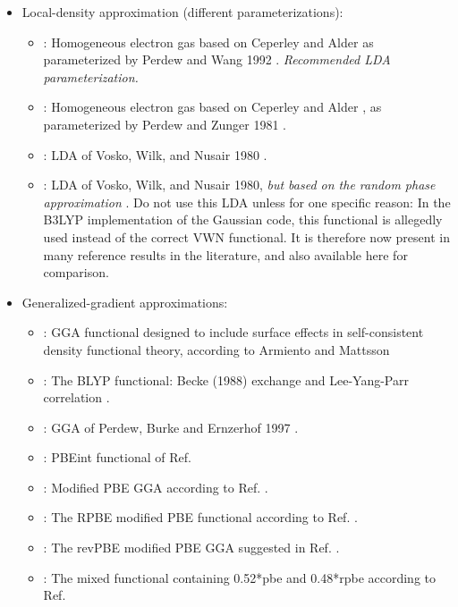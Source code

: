 \begin{itemize}
  \item Local-density approximation (different parameterizations):
    \begin{itemize}
      \item {} : Homogeneous electron gas based on Ceperley and
        Alder \cite{Cep80} as parameterized by Perdew and Wang 1992
        \cite{Per92}. \emph{Recommended LDA parameterization.}
      \item {} : Homogeneous electron gas based on Ceperley and
         Alder \cite{Cep80}, as parameterized by Perdew and Zunger 1981
         \cite{Per81}.
      \item {} : LDA of Vosko, Wilk, and Nusair 1980 \cite{Vosko80}.
      \item {} : LDA of Vosko, Wilk, and Nusair 1980, \emph{but
        based on the random phase approximation} \cite{Scuseria05}. Do
        not use this LDA unless for one specific reason: In the B3LYP
        implementation of the Gaussian code, this functional is allegedly
        used instead of the correct VWN functional. It is therefore now
        present in many reference results in the literature, and also
        available here for comparison.
    \end{itemize}
  \item Generalized-gradient approximations:
    \begin{itemize}
      \item {} : GGA functional designed to include surface effects
    in self-consistent density functional theory, according to Armiento
    and Mattsson \cite{AM05}
      \item {} : The BLYP functional: Becke (1988) exchange
      \cite{Becke88b} and Lee-Yang-Parr correlation \cite{Lee88}.
      \item {} : GGA of Perdew, Burke and Ernzerhof 1997 \cite{Per97}.
      \item {} : PBEint functional of Ref. \cite{Fabiano10}
      \item {} : Modified PBE GGA according to Ref. \cite{Perdew08}.
      \item {} : The RPBE modified PBE functional according to
        Ref. \cite{Hammer99}.
      \item {} : The revPBE modified PBE GGA suggested in Ref. \cite{Zhang98}.
      \item {} : The mixed functional containing 0.52*pbe and 0.48*rpbe according to Ref. \cite{Nattino2012}

\end{itemize}
\end{itemize}
